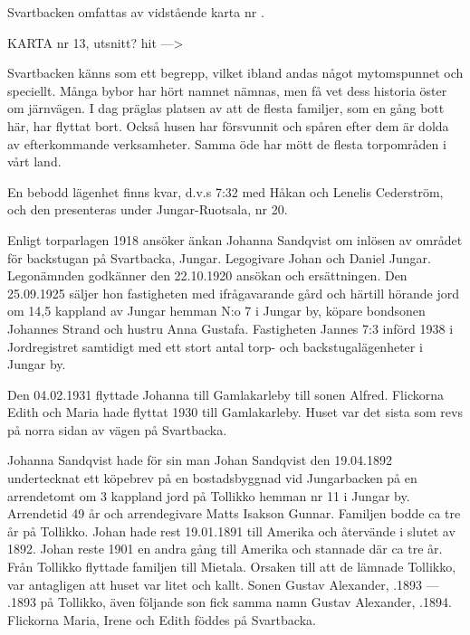 
Svartbacken omfattas av vidstående karta nr .


KARTA nr 13, utsnitt? hit --->





Svartbacken känns som ett begrepp, vilket ibland andas något mytomspunnet och speciellt. Många bybor har hört namnet nämnas, men få vet dess historia öster om järnvägen. I dag präglas platsen av att de flesta familjer, som en gång bott här, har flyttat bort. Också husen har försvunnit och spåren efter dem är dolda av efterkommande verksamheter. Samma öde har mött de flesta torpområden i vårt land.

En bebodd lägenhet finns kvar, d.v.s  7:32 med Håkan och Lenelis Cederström, och den presenteras under Jungar-Ruotsala, nr 20.





Enligt torparlagen 1918 ansöker änkan Johanna Sandqvist om inlösen av området för backstugan på Svartbacka, Jungar. Legogivare Johan och Daniel Jungar. Legonämnden godkänner den 22.10.1920 ansökan och ersättningen. Den 25.09.1925 säljer hon fastigheten med ifrågavarande gård och härtill hörande jord om 14,5 kappland av Jungar hemman N:o 7 i Jungar by, köpare  bondsonen Johannes Strand och hustru Anna Gustafa. Fastigheten Jannes 7:3 införd 1938 i Jordregistret samtidigt med ett stort antal torp- och backstugalägenheter i Jungar by.

Den 04.02.1931 flyttade Johanna till Gamlakarleby till sonen Alfred. Flickorna Edith och Maria hade flyttat 1930 till Gamlakarleby. Huset var det sista som revs på norra sidan av vägen på Svartbacka.

Johanna Sandqvist hade för sin man Johan Sandqvist den 19.04.1892	undertecknat ett köpebrev på en bostadsbyggnad vid Jungarbacken på en arrendetomt om 3 kappland jord på Tollikko	hemman nr 11 i Jungar by. Arrendetid 49 år och arrendegivare Matts	Isakson Gunnar. Familjen bodde ca tre år på Tollikko. Johan hade rest	19.01.1891 till Amerika och återvände i slutet av 1892. Johan reste 1901 en andra gång till Amerika och stannade där ca tre år. Från Tollikko flyttade familjen till Mietala. Orsaken till att de lämnade Tollikko, var antagligen att huset var litet och kallt. Sonen Gustav Alexander, .1893  ---  .1893 på Tollikko, även följande son fick samma namn Gustav Alexander, .1894. Flickorna Maria, Irene och 	Edith föddes på Svartbacka.

